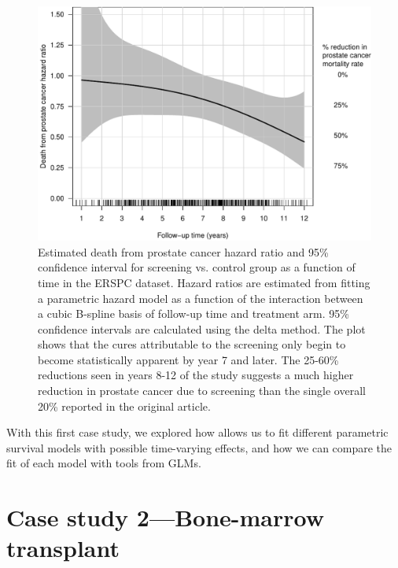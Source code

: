 \documentclass[
]{jss}
\begin{document}
\begin{CodeChunk}
\begin{figure}

{\centering \includegraphics[width=\textwidth,keepaspectratio=true]{../figures/interaction-ERSPC-1} 

}

\caption[Estimated death from prostate cancer hazard ratio and 95\% confidence interval for screening vs]{Estimated death from prostate cancer hazard ratio and 95\% confidence interval for screening vs. control group as a function of time in the ERSPC dataset. Hazard ratios are estimated from fitting a parametric hazard model as a function of the interaction between a cubic B-spline basis of follow-up time and treatment arm. 95\% confidence intervals are calculated using the delta method. The plot shows that the cures attributable to the screening only begin to become statistically apparent by year 7 and later. The 25-60\% reductions seen in years 8-12 of the study suggests a much higher reduction in prostate cancer due to screening than the single overall 20\% reported in the original article.}\label{fig:interaction-ERSPC}
\end{figure}
\end{CodeChunk}

With this first case study, we explored how  allows us to
fit different parametric survival models with possible time-varying
effects, and how we can compare the fit of each model with tools from
GLMs.

\newpage

\hypertarget{case-study-2bone-marrow-transplant}{%
\section{Case study 2---Bone-marrow
transplant}\label{case-study-2bone-marrow-transplant}}
\end{document}
